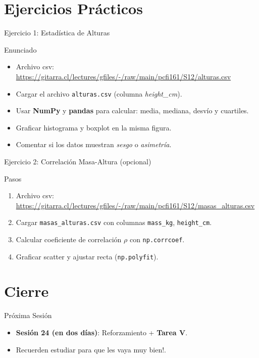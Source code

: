 \documentclass[10pt]{beamer}
\begin{document}
\section{Ejercicios Prácticos}
\begin{frame}{Ejercicio 1: Estadística de Alturas}
  \begin{block}{Enunciado}
    \begin{itemize}
      \item Archivo csv: \url{https://gitarra.cl/lectures/gfiles/-/raw/main/pcfi161/S12/alturas.csv}
      \item Cargar el archivo \texttt{alturas.csv} (columna \emph{height\_cm}).
      \item Usar \textbf{NumPy} y \textbf{pandas} para calcular: media, mediana, desvío y cuartiles.
      \item Graficar histograma y boxplot en la misma figura.
      \item Comentar si los datos muestran \emph{sesgo} o \emph{asimetría}.
    \end{itemize}
  \end{block}
\end{frame}

\begin{frame}{Ejercicio 2: Correlación Masa-Altura (opcional)}
  \begin{block}{Pasos}
    \begin{enumerate}
      \item Archivo csv: \url{https://gitarra.cl/lectures/gfiles/-/raw/main/pcfi161/S12/masas_alturas.csv}
      \item Cargar \texttt{masas\_alturas.csv} con columnas \texttt{mass\_kg}, \texttt{height\_cm}.
      \item Calcular coeficiente de correlación \(\rho\) con \texttt{np.corrcoef}.
      \item Graficar scatter y ajustar recta (\texttt{np.polyfit}).
    \end{enumerate}
  \end{block}
\end{frame}

\section{Cierre}
\begin{frame}{Próxima Sesión}
  \begin{itemize}
    \item \textbf{Sesión 24 (en dos días)}: Reforzamiento + \textbf{Tarea V}.
    \item Recuerden estudiar para que les vaya muy bien!.
  \end{itemize}
\end{frame}
\end{document}
